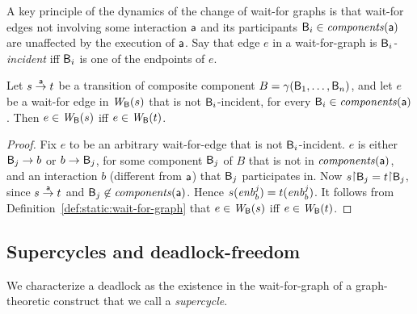 A key principle of the dynamics of the change of wait-for graphs is that 
wait-for edges not involving some interaction
$\mathsf{a}$ and its participants $\mathsf{B}_i \in \mathit{components}(\mathsf{a})$ are unaffected by the execution
of $\mathsf{a}$.  Say that edge $e$ in a wait-for-graph
is \emph{$\mathsf{B}_i$-incident} iff $\mathsf{B}_i$ is one of the endpoints of $e$.


\begin{proposition} \label{prop:wait-for-edge-preservation}
Let $s \stackrel{\mathsf{a}}{\rightarrow} t$ be a transition of composite component $B =
\gamma(\mathsf{B}_1,\dots,\mathsf{B}_n)$, and let $e$ be a wait-for edge in $\mathit{W}_{\mathsf{B}}({s})$
that is not $\mathsf{B}_i$-incident, for every $\mathsf{B}_i \in \mathit{components}(\mathsf{a})$. Then $e \in
\mathit{W}_{\mathsf{B}}({s})$ iff $e \in \mathit{W}_{\mathsf{B}}({t})$. 
\end{proposition}
%
%
\begin{proof}
Fix $e$ to be an arbitrary wait-for-edge that is not
$\mathsf{B}_i$-incident. $e$ is either $\mathsf{B}_j \rightarrow b$ or $b \rightarrow \mathsf{B}_j$, for some
component $\mathsf{B}_j$ of $B$ that is not in $\mathit{components}(\mathsf{a})$, and an interaction $b$
(different from $\mathsf{a}$) that $\mathsf{B}_j$ participates in.
%
Now $s \pj \B_j = t \pj \B_j$, since $s \stackrel{\mathsf{a}}{\rightarrow} t$ and $\mathsf{B}_j \not\in \mathit{components}(\mathsf{a})$. Hence $s(\mathit{enb}_{b}^{j}) =
t(\mathit{enb}_{b}^{j})$. It follows from Definition~\ref{def:static:wait-for-graph} that 
$e \in \mathit{W}_{\mathsf{B}}({s})$ iff $e \in \mathit{W}_{\mathsf{B}}({t})$.
\end{proof}



\subsection{Supercycles and deadlock-freedom}

We characterize a deadlock as the existence in the wait-for-graph of a
graph-theoretic construct that we call a {\em supercycle}.

